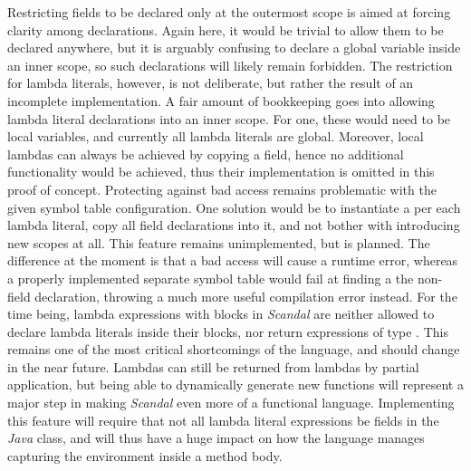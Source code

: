 Restricting fields to be declared only at the outermost scope is aimed at forcing clarity among declarations. Again here, it would be trivial to allow them to be declared anywhere, but it is arguably confusing to declare a global variable inside an inner scope, so such declarations will likely remain forbidden. The restriction for lambda literals, however, is not deliberate, but rather the result of an incomplete implementation. A fair amount of bookkeeping goes into allowing lambda literal declarations into an inner scope. For one, these would need to be local variables, and currently all lambda literals are global. Moreover, local lambdas can always be achieved by copying a field, hence no additional functionality would be achieved, thus their implementation is omitted in this proof of concept. Protecting against bad access remains problematic with the given symbol table configuration. One solution would be to instantiate a  per each lambda literal, copy all field declarations into it, and not bother with introducing new scopes at all. This feature remains unimplemented, but is planned. The difference at the moment is that a bad access will cause a runtime error, whereas a properly implemented separate symbol table would fail at finding a the non-field declaration, throwing a much more useful compilation error instead. For the time being, lambda expressions with blocks in \emph{Scandal} are neither allowed to declare lambda literals inside their blocks, nor return expressions of type . This remains one of the most critical shortcomings of the language, and should change in the near future. Lambdas can still be returned from lambdas by partial application, but being able to dynamically generate new functions will represent a major step in making \emph{Scandal} even more of a functional language. Implementing this feature will require that not all lambda literal expressions be fields in the \emph{Java} class, and will thus have a huge impact on how the language manages capturing the environment inside a method body.

